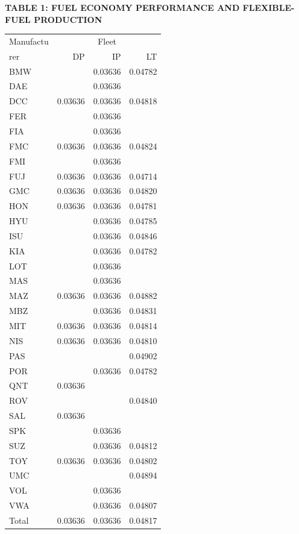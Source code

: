 \vspace{1em}
\noindent\textbf{TABLE 1: FUEL ECONOMY PERFORMANCE AND FLEXIBLE-FUEL PRODUCTION}
\vspace{0.5em}

\begin{tabular}{lrrr}
\toprule
Manufactu & \multicolumn{3}{c}{Fleet} \\
rer & DP & IP & LT \\
\midrule
BMW &  & 0.03636 & 0.04782 \\
DAE &  & 0.03636 &  \\
DCC & 0.03636 & 0.03636 & 0.04818 \\
FER &  & 0.03636 &  \\
FIA &  & 0.03636 &  \\
FMC & 0.03636 & 0.03636 & 0.04824 \\
FMI &  & 0.03636 &  \\
FUJ & 0.03636 & 0.03636 & 0.04714 \\
GMC & 0.03636 & 0.03636 & 0.04820 \\
HON & 0.03636 & 0.03636 & 0.04781 \\
HYU &  & 0.03636 & 0.04785 \\
ISU &  & 0.03636 & 0.04846 \\
KIA &  & 0.03636 & 0.04782 \\
LOT &  & 0.03636 &  \\
MAS &  & 0.03636 &  \\
MAZ & 0.03636 & 0.03636 & 0.04882 \\
MBZ &  & 0.03636 & 0.04831 \\
MIT & 0.03636 & 0.03636 & 0.04814 \\
NIS & 0.03636 & 0.03636 & 0.04810 \\
PAS &  &  & 0.04902 \\
POR &  & 0.03636 & 0.04782 \\
QNT & 0.03636 &  &  \\
ROV &  &  & 0.04840 \\
SAL & 0.03636 &  &  \\
SPK &  & 0.03636 &  \\
SUZ &  & 0.03636 & 0.04812 \\
TOY & 0.03636 & 0.03636 & 0.04802 \\
UMC &  &  & 0.04894 \\
VOL &  & 0.03636 &  \\
VWA &  & 0.03636 & 0.04807 \\
Total & 0.03636 & 0.03636 & 0.04817 \\
\bottomrule
\end{tabular}

